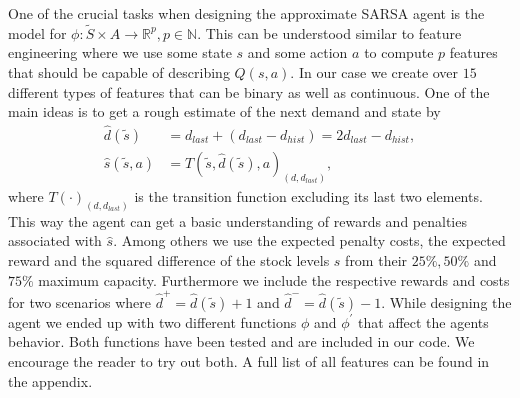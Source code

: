 \documentclass[journal, a4paper]{IEEEtran}
\theoremstyle{plain}
\theoremstyle{definition}
\begin{document}
One of the crucial tasks when designing the approximate SARSA agent is the model for $\phi: \tilde{S} \times A \rightarrow \mathbb{R}^p, p \in \mathbb{N}$. This can be understood similar to feature engineering where we use some state $s$ and some action $a$ to compute $p$ features that should be capable of describing $Q(s,a)$. In our case we create over $15$ different types of features that can be binary as well as continuous. One of the main ideas is to get a rough estimate of the next demand and state by
\begin{equation}
	\begin{split}
		\hat{d}(\tilde{s})&= d_{last} + \left( d_{last} - d_{hist} \right) = 2d_{last} - d_{hist}, \\
		\hat{s}(\tilde{s}, a) &= T(\tilde{s}, \hat{d}(\tilde{s}), a)_{(d, d_{last})},
	\end{split}
\end{equation}
where $T(\cdot)_{(d, d_{last})}$ is the transition function excluding its last two elements. This way the agent can get a basic understanding of rewards and penalties associated with $\hat{s}$. Among others we use the expected penalty costs, the expected reward and the squared difference of the stock levels $s$ from their $25\%, 50\%$ and $75\% $ maximum capacity. Furthermore we include the respective rewards and costs for two scenarios where $\hat{d}^+=\hat{d}(\tilde{s}) + 1$ and $\hat{d}^-=\hat{d}(\tilde{s})  - 1$. While designing the agent we ended up with two different functions $\phi$ and $\phi^\prime$ that affect the agents behavior. Both functions have been tested and are included in our code. We encourage the reader to try out both. A full list of all features can be found in the appendix. \newline
\end{document}
